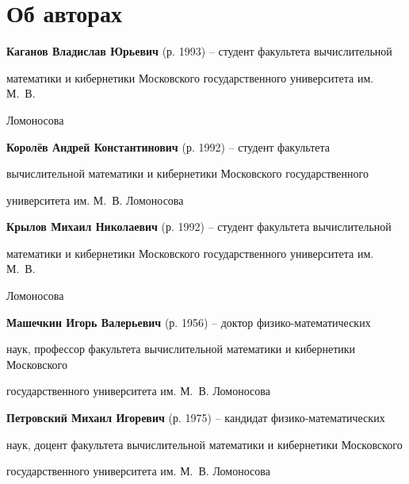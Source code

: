\section*{Об авторах}


{\bf Каганов Владислав Юрьевич}  (р. 1993) -- студент факультета вычислительной 


математики и кибернетики Московского государственного университета им. М.~В. 


Ломоносова





{\bf Королёв Андрей Константинович}  (р. 1992) -- студент факультета 


вычислительной математики и кибернетики Московского государственного 


университета им. М.~В. Ломоносова





{\bf Крылов Михаил Николаевич}  (р. 1992) -- студент факультета вычислительной 


математики и кибернетики Московского государственного университета им. М.~В. 


Ломоносова





{\bf Машечкин Игорь Валерьевич}  (р. 1956) -- доктор физико-математических 


наук, профессор факультета вычислительной математики и кибернетики Московского 


государственного университета им. М.~В. Ломоносова





{\bf Петровский Михаил Игоревич}  (р. 1975) -- кандидат физико-математических 


наук, доцент факультета вычислительной математики и кибернетики Московского 


государственного университета им. М.~В. Ломоносова








